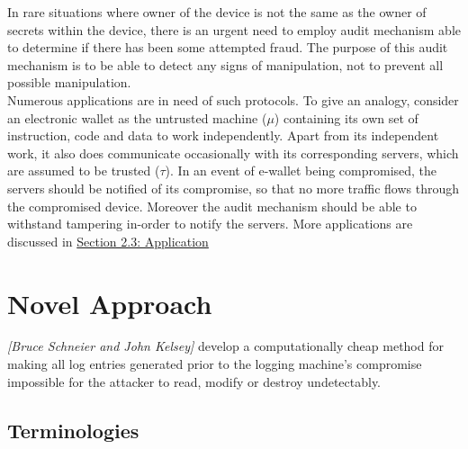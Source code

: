 \documentclass[12pt, letter]{article}
\newcommand\paperAuthors[2]{[#1 and #2]}
\newcommand\makePaperAuthors{\paperAuthors{Bruce Schneier}{John Kelsey}}
\begin{document}
In rare situations where owner of the device is not the same as the owner of secrets within the device, there is an urgent need to employ audit mechanism able to determine if there has been some attempted fraud. The purpose of this audit mechanism is to be able to detect any signs of manipulation, not to prevent all possible manipulation.\\

Numerous applications are in need of such protocols. To give an analogy, consider an electronic wallet as the untrusted machine ($\mu$) containing its own set of instruction, code and data to work independently. Apart from its independent work, it also does communicate occasionally with its corresponding servers, which are assumed to be trusted ($\tau$). In an event of e-wallet being compromised, the servers should be notified of its compromise, so that no more traffic flows through the compromised device. Moreover the audit mechanism should be able to withstand tampering in-order to notify the servers. More applications are discussed in \hyperref[sec:application]{Section 2.3: Application}


\section{Novel Approach}

\textit{\makePaperAuthors} develop a computationally cheap method for making all log entries generated prior to the logging machine’s compromise impossible for the attacker to read, modify or destroy undetectably.

\subsection{Terminologies}
\end{document}

